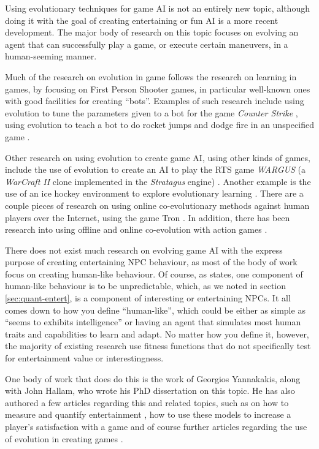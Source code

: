 \documentclass[]{report}
\begin{document}
Using evolutionary techniques for game AI is not an entirely new topic, although
doing it with the goal of creating entertaining or fun AI is a more recent
development. The major body of research on this topic focuses on evolving an
agent that can successfully play a game, or execute certain maneuvers, in a
human-seeming manner.

Much of the research on evolution in game follows the research on learning in
games, by focusing on First Person Shooter games, in particular well-known ones
with good facilities for creating ``bots''. Examples of such research include
using evolution to tune the parameters given to a bot for the game \emph{Counter
  Strike} \citep{cole2004using}, using evolution to teach a bot to do rocket
jumps and dodge fire in an unspecified game \citep{champandard2003ai}.

Other research on using evolution to create game AI, using other kinds of games,
include the use of evolution to create an AI to play the RTS game \emph{WARGUS}
(a \emph{WarCraft II} clone implemented in the \emph{Stratagus} engine)
\citep{spronck2004difficulty}. Another example is the use of an ice hockey
environment to explore evolutionary learning \citep{blair1999exploring}. There
are a couple pieces of research on using online co-evolutionary methods against
human players over the Internet, using the game Tron
\citep{funes2000measuring,funes1998animal}. In addition, there has been research
into using offline and online co-evolution with action games
\citep{demasi2003online}.

There does not exist much research on evolving game AI with the express purpose
of creating entertaining NPC behaviour, as most of the body of work focus on
creating human-like behaviour. Of course, as \citet{bauckhage2003learning}
states, one component of human-like behaviour is to be unpredictable, which, as
we noted in section \ref{sec:quant-entert}, is a component of interesting or
entertaining NPCs. It all comes down to how you define ``human-like'', which
could be either as simple as ``seems to exhibits intelligence'' or having an
agent that simulates most human traits and capabilities to learn and adapt. No
matter how you define it, however, the majority of existing research use fitness
functions that do not specifically test for entertainment value or
interestingness.

One body of work that does do this is the work of Georgios Yannakakis, along
with John Hallam, who wrote his PhD dissertation \citep{yannakakis2005ai} on
this topic. He has also authored a few articles regarding this and related
topics, such as on how to measure and quantify entertainment
\citep{yannakakis2007modeling,yannakakis2008model,yannakakis2008entertainment},
how to use these models to increase a player's satisfaction with a game
\citep{yannakakis2009real,yannakakis2008model} and of course further articles
regarding the use of evolution in creating games
\citep{yannakakis2004evolving,yannakakis2004interactive}.
\end{document}
